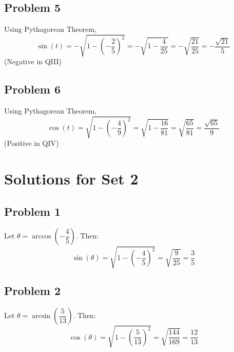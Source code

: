 \documentclass[12pt]{article}
\begin{document}
\subsection*{Problem 5}
Using Pythagorean Theorem,
\[
\sin(t) = -\sqrt{1 - \left(-\dfrac{2}{5}\right)^2} = -\sqrt{1 - \dfrac{4}{25}} = -\sqrt{\dfrac{21}{25}} = \boxed{-\dfrac{\sqrt{21}}{5}}
\]
(Negative in QIII)

\subsection*{Problem 6}
Using Pythagorean Theorem,
\[
\cos(t) = \sqrt{1 - \left(-\dfrac{4}{9}\right)^2} = \sqrt{1 - \dfrac{16}{81}} = \sqrt{\dfrac{65}{81}} = \boxed{\dfrac{\sqrt{65}}{9}}
\]
(Positive in QIV)

\section*{Solutions for Set 2}
\subsection*{Problem 1}
Let \(\theta = \arccos\left(-\dfrac{4}{5}\right)\). Then:
\[
\sin(\theta) = \sqrt{1 - \left(-\dfrac{4}{5}\right)^2} = \sqrt{\dfrac{9}{25}} = \boxed{\dfrac{3}{5}}
\]


\subsection*{Problem 2}
Let \(\theta = \arcsin\left(\dfrac{5}{13}\right)\). Then:
\[
\cos(\theta) = \sqrt{1 - \left(\dfrac{5}{13}\right)^2} = \sqrt{\dfrac{144}{169}} = \boxed{\dfrac{12}{13}}
\]
\end{document}
